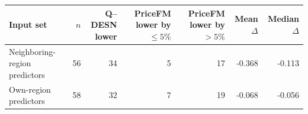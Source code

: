 \begingroup
\TableStyle
\scriptsize
\setlength{\tabcolsep}{3pt}
\begin{tabular}{@{}lrrrrrr@{}}
\toprule
Input set & $n$ & \shortstack{Q--DESN\\lower} & \shortstack{PriceFM\\lower by $\leq 5\%$} & \shortstack{PriceFM\\lower by $>5\%$} & \shortstack{Mean\\$\Delta$} & \shortstack{Median\\$\Delta$} \\
\midrule
Neighboring-region predictors & 56 & 34 & 5 & 17 & -0.368 & -0.113 \\
Own-region predictors & 58 & 32 & 7 & 19 & -0.068 & -0.056 \\
\bottomrule
\end{tabular}
\endgroup
